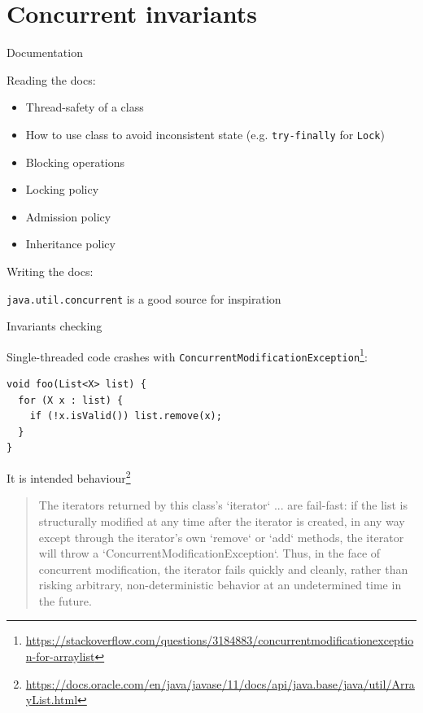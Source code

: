 \section{Concurrent invariants}
\showTOC


\begin{frame}[t]{Documentation}

Reading  the docs:
\begin{itemize}
  \item Thread-safety of a class
  \item How to use class to avoid inconsistent state (e.g. \texttt{try-finally} for \texttt{Lock})
  \item Blocking operations
  \item Locking policy
  \item Admission policy
  \item Inheritance policy
\end{itemize}

\pause

 {Writing the docs:}

\pause
\pause

\texttt{java.util.concurrent} is a good source for inspiration

\end{frame}



\begin{frame}[fragile,t]{Invariants checking}

Single-threaded code crashes with \texttt{ConcurrentModificationException}\footnote{\tiny\url{https://stackoverflow.com/questions/3184883/concurrentmodificationexception-for-arraylist}}:

\begin{verbatim}
void foo(List<X> list) {  
  for (X x : list) {
    if (!x.isValid()) list.remove(x);
  }
}
\end{verbatim}

\pause

It is intended behaviour\footnote<2->{\tiny\url{https://docs.oracle.com/en/java/javase/11/docs/api/java.base/java/util/ArrayList.html}}
\begin{quote}
  The iterators returned by this class's `iterator` ... are fail-fast: if the list is structurally modified at any time after the iterator is created, in any way except through the iterator's own `remove` or `add` methods, the iterator will throw a `ConcurrentModificationException`. Thus, in the face of concurrent modification, the iterator fails quickly and cleanly, rather than risking arbitrary, non-deterministic behavior at an undetermined time in the future. 
\end{quote}

\end{frame}

